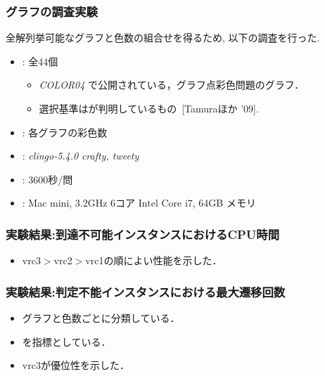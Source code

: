 
\begin{frame}\frametitle{グラフの調査実験}
  全解列挙可能なグラフと色数の組合せを得るため, 以下の調査を行った.
  \begin{itemize}
    \item {}: 全44個
    \begin{itemize}
      \item \textit{COLOR04}
      で公開されている，グラフ点彩色問題のグラフ．
      \item 選択基準はが判明しているもの~[Tamuraほか '09].
    \end{itemize}
    \item {}: 各グラフの彩色数

    \item {}: \textit{clingo-5.4.0} \textit{crafty, tweety}
    \item {}: 3600秒/問
    \item {}: Mac mini, 3.2GHz 6コア Intel Core i7, 64GB メモリ
  \end{itemize}
  
\end{frame}


\begin{frame}\frametitle{実験結果:到達不可能インスタンスにおけるCPU時間}

  \begin{table}[t]
    \centering
      
  \end{table}

  \begin{itemize}
    \item vrc3$>$vrc2$>$vrc1の順によい性能を示した．
  \end{itemize}
  
\end{frame}


\begin{frame}\frametitle{実験結果:判定不能インスタンスにおける最大遷移回数}
  
  \begin{table}[t]
    \centering
    
  \end{table}

  \begin{itemize}
    \item グラフと色数ごとに分類している．
    \item {}を指標としている．
    \item vrc3が優位性を示した．
  \end{itemize}

\end{frame}

